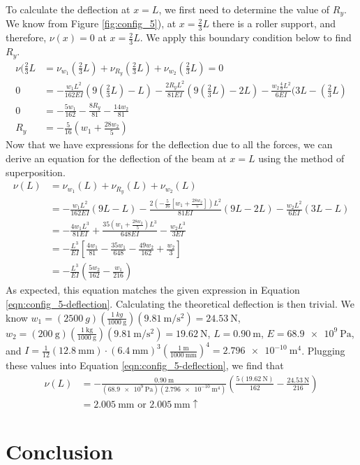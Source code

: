 \documentclass[12 pt]{article}
\begin{document}
To calculate the deflection at $x=L$, we first need to determine the value of $R_y$. We know from Figure \ref{fig:config_5}), at $x=\frac{2}{3}L$ there is a roller support, and therefore, $\nu(x)=0$ at $x=\frac{2}{3}L$. We apply this boundary condition below to find $R_y$.
\begin{align*}
	\nu(\frac{2}{3}L&=\nu_{w_1}(\frac{2}{3}L)+\nu_{R_y}(\frac{2}{3}L)+\nu_{w_2}(\frac{2}{3}L)=0\\
	0&=-\frac{w_1L^2}{162EI}(9(\frac{2}{3}L)-L)-\frac{2R_yL^2}{81EI}(9(\frac{2}{3}L)-2L)-\frac{w_2\frac{4}{9}L^2}{6EI}(3L-(\frac{2}{3}L)\\
	0&=-\frac{5w_1}{162}-\frac{8R_y}{81}-\frac{14w_2}{81}\\
	R_y&=-\frac{5}{16}(w_1+\frac{28w_2}{5})	
\end{align*}
Now that we have expressions for the deflection due to all the forces, we can derive an equation for the deflection of the beam at $x=L$ using the method of superposition.
\begin{align*}
	\nu(L)&=\nu_{w_1}(L)+\nu_{R_y}(L)+\nu_{w_2}(L)\\
	&=-\frac{w_1L^2}{162EI}(9L-L)-\frac{2\left(-\frac{5}{16}\left[w_1+\frac{28w_2}{5}\right]\right)L^2}{81EI}(9L-2L)-\frac{w_2L^2}{6EI}(3L-L)\\
	&=-\frac{4w_1L^3}{81EI}+\frac{35\left(w_1+\frac{28w_2}{5}\right)L^3}{648EI}-\frac{w_2L^3}{3EI}\\
	&=-\frac{L^3}{EI}\left[\frac{4w_1}{81}-\frac{35w_1}{648}-\frac{49w_2}{162}+\frac{w_2}{3}\right]\\
	&=-\frac{L^3}{EI}\left(\frac{5w_2}{162}-\frac{w_1}{216}\right)
\end{align*}
As expected, this equation matches the given expression in Equation \ref{eqn:config_5-deflection}. Calculating the theoretical deflection is then trivial. We know $w_1=(\qty{2500}{g})(\frac{\qty{1}{kg}}{\qty{1000}{\g}})(\qty[per-mode=fraction]{9.81}{\m\per\s\squared})=\qty{24.53}{\N}$, $w_2=(\qty{200}{\g})(\frac{\qty{1}{\kg}}{\qty{1000}{\g}})(\qty[per-mode=fraction]{9.81}{\m\per\s\squared})=\qty{19.62}{\N}$, $L=\qty{0.90}{\m}$, $E=\qty{68.9e9}{\Pa}$, and $I=\frac{1}{12}(\qty{12.8}{\mm})\cdot(\qty{6.4}{\mm})^3(\frac{\qty{1}{\m}}{\qty{1000}{\mm}})^4=\qty{2.796e-10}{\m^4}$. Plugging these values into Equation \ref{eqn:config_5-deflection}, we find that
\begin{align*}
	\nu(L)&=-\frac{\qty{0.90}{\m}}{(\qty{68.9e9}{\Pa})(\qty{2.796e-10}{\m^4})}\left(\frac{5(\qty{19.62}{\N})}{162}-\frac{\qty{24.53}{\N}}{216}\right)\\
	&=\qty{2.005}{\mm}\text{ or }\qty{2.005}{\mm}\uparrow
\end{align*}

\section{Conclusion} \label{conclusion}
\end{document}

